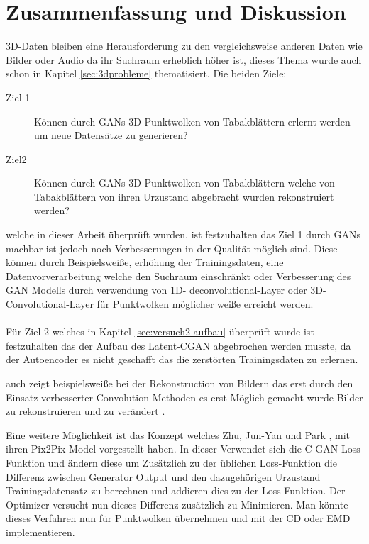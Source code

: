 \documentclass{llncs}
\begin{document}
\section{Zusammenfassung und Diskussion }

3D-Daten bleiben eine Herausforderung zu den vergleichsweise anderen Daten wie Bilder oder Audio da ihr Suchraum erheblich höher ist, dieses Thema wurde auch schon in Kapitel \ref{sec:3dprobleme} thematisiert. Die beiden Ziele:
 
\begin{description}
	\item[Ziel 1]
	Können durch GANs 3D-Punktwolken von Tabakblättern erlernt werden um neue Datensätze zu generieren?\\
	\item[Ziel2]
	Können durch GANs 3D-Punktwolken von Tabakblättern welche von Tabakblättern von ihren Urzustand abgebracht wurden rekonstruiert werden? 
\end{description}


welche in dieser Arbeit überprüft wurden, ist festzuhalten das Ziel 1 durch GANs machbar ist jedoch noch Verbesserungen in der Qualität möglich sind. Diese können durch Beispielsweiße, erhöhung der Trainingsdaten, eine Datenvorverarbeitung welche den Suchraum einschränkt oder Verbesserung des GAN Modells durch verwendung von 1D- deconvolutional-Layer oder 3D-Convolutional-Layer für Punktwolken \cite{3d-conv} möglicher weiße erreicht werden. 
\\\\
Für Ziel 2 welches in Kapitel \ref{sec:versuch2-aufbau} überprüft wurde ist festzuhalten das der Aufbau des Latent-CGAN abgebrochen werden musste, da der Autoencoder es nicht geschafft das die zerstörten Trainingsdaten zu erlernen. 


auch zeigt beispielsweiße bei der Rekonstruction von Bildern das erst durch den Einsatz verbesserter Convolution Methoden es erst Möglich gemacht wurde Bilder zu rekonstruieren und zu verändert \cite{imagerecon}.

Eine weitere Möglichkeit ist das Konzept welches Zhu, Jun-Yan und Park \cite{pix2pix}, mit ihren Pix2Pix Model vorgestellt haben. In dieser Verwendet sich die C-GAN Loss Funktion und ändern diese um Zusätzlich zu der üblichen Loss-Funktion die Differenz zwischen Generator Output und den dazugehörigen Urzustand Trainingsdatensatz zu berechnen und addieren dies zu der Loss-Funktion. Der Optimizer versucht nun dieses Differenz zusätzlich zu Minimieren. Man könnte dieses Verfahren nun für Punktwolken übernehmen und mit der CD oder EMD implementieren. 
\end{document}
